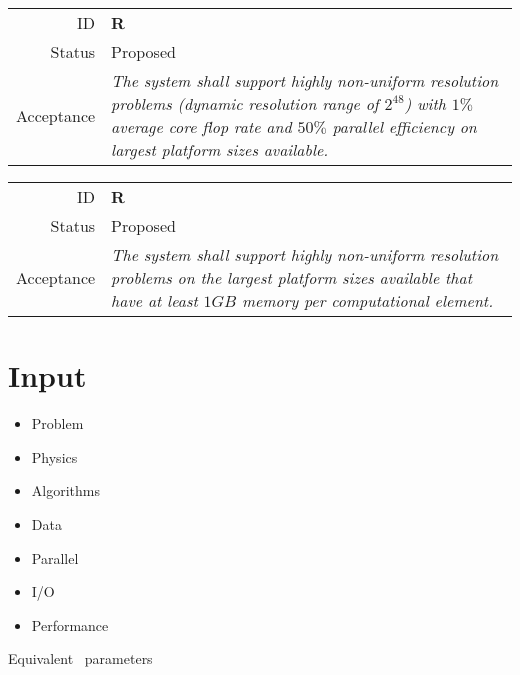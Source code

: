 \documentclass{book}
\newcommand{\req}[3]{
\begin{tabular}{rl}
ID & \textbf{R#1} \\
Status & \textsf{#2} \\
Acceptance & \textit{#3}
\end{tabular}
}
\begin{document}
\req
  {}
  {Proposed}
%
  {The system shall support highly non-uniform resolution problems
  (dynamic resolution range of $2^48$) with $1\%$ average core flop
  rate and $50\%$ parallel efficiency on largest platform sizes
  available.}

\req
  {}
  {Proposed}
%
  {The system shall support highly non-uniform resolution problems on
  the largest platform sizes available that have at least $1GB$ memory
  per computational element.}

\section{Input}


\begin{itemize}
\item Problem
\item Physics
\item Algorithms
\item Data
\item Parallel
\item I/O
\item Performance
\end{itemize}

Equivalent \enzo\ parameters
\end{document}
